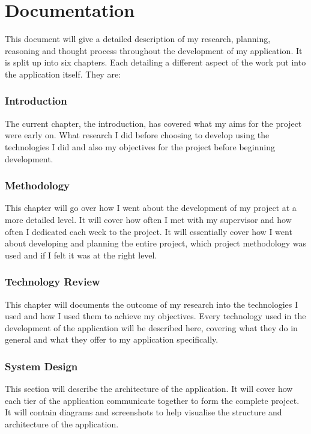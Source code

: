\section{Documentation}
This document will give a detailed description of my research, planning, reasoning and thought process throughout the development of my application. It is split up into six chapters. Each detailing a different aspect of the work put into the application itself. They are: 

    \subsubsection{Introduction}
    The current chapter, the introduction, has covered what my aims for the project were early on. What research I did before choosing to develop using the technologies I did and also my objectives for the project before beginning development.
    
    \subsubsection{Methodology}
    This chapter will go over how I went about the development of my project at a more detailed level. It will cover how often I met with my supervisor and how often I dedicated each week to the project. It will essentially cover how I went about developing and planning the entire project, which project methodology was used and if I felt it was at the right level. 
    
    \subsubsection{Technology Review}
    This chapter will documents the outcome of my research into the technologies I used and how I used them to achieve my objectives. Every technology used in the development of the application will be described here, covering what they do in general and what they offer to my application specifically.
    
    \subsubsection{System Design}
    This section will describe the architecture of the application. It will cover how each tier of the application communicate together to form the complete project. It will contain diagrams and screenshots to help visualise the structure and architecture of the application.
    
